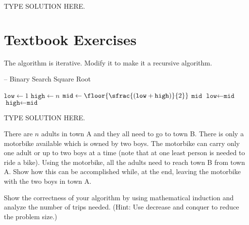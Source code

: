 \documentclass[final]{article}
\begin{document}
\begin{question}
    TYPE SOLUTION HERE.
\end{question}

\section{Textbook Exercises}
\begin{exercise}{2.3}
    The algorithm  is iterative. Modify it to make it a recursive algorithm.

    \begin{algorithm}[H]
        \caption[]{ -- Binary Search Square Root}
        \label{alg:binsqrt}
        \begin{algorithmic}[1]
            \State $\texttt{low} \gets 1$   
            \State $\texttt{high} \gets n$  
            \While{\True}
            \State $\texttt{mid} \gets \floor{\sfrac{(\texttt{low} + \texttt{high})}{2}}$   
            \State \Return $\texttt{mid}$
             
            \State $\texttt{low} \gets \texttt{mid}$
            \Else {}
            \State $\texttt{high} \gets \texttt{mid}$
            \EndIf
            \EndWhile
            \EndFunction
        \end{algorithmic}
    \end{algorithm}
\end{exercise}

\begin{solution}
    TYPE SOLUTION HERE.
\end{solution}

\begin{exercise}{2.9}
    There are $n$ adults in town A and they all need to go to town B. There is only a motorbike available which is owned by two boys.
    The motorbike can carry only one adult or up to two boys at a time (note that at one least person is needed to ride a bike). Using the motorbike, all the adults need to reach town B from town A.
    Show how this can be accomplished while, at the end, leaving the motorbike with the two boys in town A.

    Show the correctness of your algorithm by using mathematical induction and analyze the number of trips needed. (Hint: Use decrease and conquer to reduce the problem size.)
\end{exercise}
\end{document}
